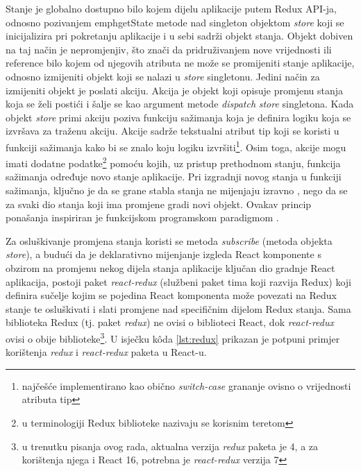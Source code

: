 \documentclass[times, utf8, diplomski, numeric]{fer}
\begin{document}
Stanje je globalno dostupno bilo kojem dijelu aplikacije putem Redux API-ja, odnosno pozivanjem emph{getState} metode nad singleton objektom \emph{store} koji se inicijalizira pri pokretanju aplikacije i u sebi sadrži objekt stanja. 
Objekt dobiven na taj način je nepromjenjiv, što znači da pridruživanjem nove vrijednosti ili reference bilo kojem od njegovih atributa ne može se promijeniti stanje aplikacije, odnosno izmijeniti objekt koji se nalazi u \emph{store} singletonu.
Jedini način za izmijeniti objekt je poslati  akciju.
Akcija  je objekt koji opisuje promjenu stanja koja se želi postići i šalje se kao argument metode \emph{dispatch} \emph{store} singletona.
Kada objekt \emph{store} primi akciju poziva funkciju sažimanja  koja je definira logiku koja se izvršava za traženu akciju.
Akcije sadrže tekstualni atribut tip  koji se koristi u funkciji sažimanja kako bi se znalo koju logiku izvršiti\footnote{
    najčešće implementirano kao obično \emph{switch-case} grananje ovisno o vrijednosti atributa tip
}.
Osim toga, akcije mogu imati dodatne podatke\footnote{
    u terminologiji Redux biblioteke nazivaju se korisnim teretom 
} pomoću kojih, uz pristup prethodnom stanju, funkcija sažimanja određuje novo stanje aplikacije.
Pri izgradnji novog stanja u funkciji sažimanja, ključno je da se grane stabla stanja ne mijenjaju izravno , nego da se za svaki dio stanja koji ima promjene gradi novi objekt.
Ovakav princip ponašanja inspiriran je funkcijskom programskom paradigmom \citep{redux}.

Za osluškivanje promjena stanja koristi se metoda \emph{subscribe} (metoda objekta \emph{store}), a budući da je deklarativno mijenjanje izgleda React komponente s obzirom na promjenu nekog dijela stanja aplikacije ključan dio gradnje React aplikacija, postoji paket \emph{react-redux} (službeni paket tima koji razvija Redux) koji definira sučelje kojim se pojedina React komponenta može povezati  na Redux stanje te osluškivati i slati promjene nad specifičnim dijelom Redux stanja.
Sama biblioteka Redux (tj. paket \emph{redux}) ne ovisi o biblioteci React, dok \emph{react-redux} ovisi o obije biblioteke\footnote{
    u trenutku pisanja ovog rada, aktualna verzija \emph{redux} paketa je 4, a za korištenja njega i React 16, potrebna je \emph{react-redux} verzija 7
}.
U isječku kôda \ref{lst:redux} prikazan je potpuni primjer korištenja \emph{redux} i \emph{react-redux} paketa u React-u.
\end{document}
